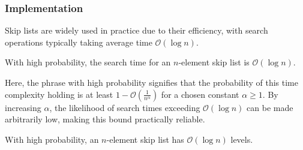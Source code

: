 \subsubsection{Implementation}
Skip lists are widely used in practice due to their efficiency, with search operations typically taking average time $\mathcal{O}(\log n)$.
\begin{theorem}
    With high probability, the search time for an $n$-element skip list is $\mathcal{O}(\log n)$.
\end{theorem}
Here, the phrase with high probability signifies that the probability of this time complexity holding is at least $1-\mathcal{O}\left(\frac{1}{n^\alpha}\right)$ for a chosen constant $\alpha\geq 1$. 
By increasing $\alpha$, the likelihood of search times exceeding $\mathcal{O}(\log n)$ can be made arbitrarily low, making this bound practically reliable.
\begin{lemma}
    With high probability, an $n$-element skip list has $\mathcal{O}(\log n)$ levels.
\end{lemma}